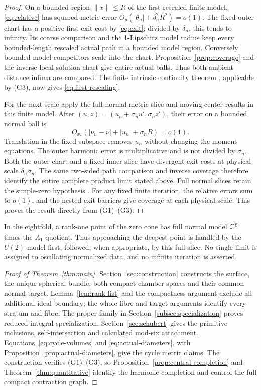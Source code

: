 \begin{proof}
On a bounded region \(\|x\|\le R\) of the first rescaled
finite model, \eqref{eq:relative} has squared-metric error
\(O_p(|\theta_n|+\delta_n^2R^2)=o(1)\).
The fixed outer chart has a positive first-exit cost by
\eqref{eq:exit}; divided by \(\delta_n\), this tends to infinity.
Its coarse comparison and the 1-Lipschitz model radius keep
every bounded-length rescaled actual path in a bounded model
region. Conversely bounded model competitors scale into the
chart. Proposition~\ref{prop:coverage} and the inverse local
solution chart give entire actual balls. Thus both ambient
distance infima are compared. The finite intrinsic continuity
theorem \cite[Theorem~5.1]{wuebben14}, applicable by (G3), now
gives \eqref{eq:first-rescaling}.

For the next scale apply the full normal metric slice and
moving-center results \cite[Sections~4,6]{wuebben14} in this
finite model. After \((u,z)=(u_n+\sigma_n u',\sigma_n z')\),
their error on a bounded normal ball is
\[
 O_{x_*}(|\nu_n-\nu|+|u_n|+\sigma_n R)=o(1).
\]
Translation in the fixed subspace removes \(u_n\) without
changing the moment equations. The outer harmonic error is
multiplicative and is not divided by \(\sigma_n\).
Both the outer chart and a fixed inner slice have divergent
exit costs at physical scale \(\delta_n\sigma_n\).
The same two-sided path comparison and inverse coverage
therefore identify the entire complete product limit stated above.
Full normal slices retain the simple-zero hypothesis
\cite[Lemma~6.3]{wuebben14}. For any fixed finite iteration,
the relative errors sum to \(o(1)\), and the nested exit
barriers give coverage at each physical scale. This proves
the result directly from (G1)--(G3).
\end{proof}

In the eightfold, a rank-one point of the zero cone has full
normal model \(\mathbb C^6\) times the \(A_1\) quotient.
Thus approaching the deepest point is handled by the \(U(2)\)
model first, followed, when appropriate, by this full slice.
No single limit is assigned to oscillating normalized data,
and no infinite iteration is asserted.

\begin{proof}[Proof of Theorem~\ref{thm:main}]
Section~\ref{sec:construction} constructs the surface, the unique
spherical bundle, both compact chamber spaces and their common
normal target. Lemma~\ref{lem:rank-list} and the compactness
argument exclude all additional ideal boundary; the whole-fibre
and target arguments identify every stratum and fibre.
The proper family in Section~\ref{subsec:specialization}
proves reduced integral specialization.
Section~\ref{sec:schubert} gives the primitive inclusions,
self-intersection and calculated mod-six attachment.
Equations~\eqref{eq:cycle-volumes} and
\eqref{eq:actual-diameters}, with
Proposition~\ref{prop:actual-diameters}, give the cycle metric
claims. The construction verifies (G1)--(G3), so
Proposition~\ref{prop:central-completion} and
Theorem~\ref{thm:quantitative} identify the harmonic completion
and control the full compact contraction graph.
\end{proof}

